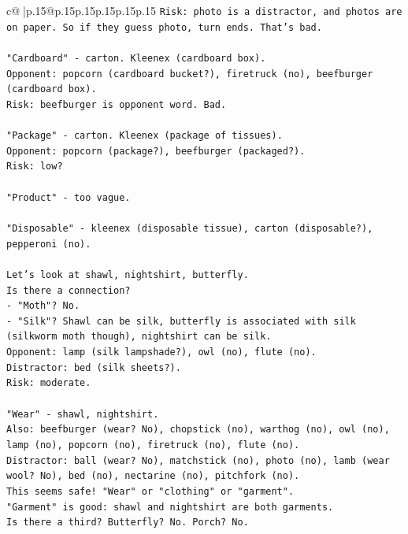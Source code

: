 \documentclass{article}
\begin{document}
{\begin{supertabular}{c@{$\;$}|p{.15\linewidth}@{}p{.15\linewidth}p{.15\linewidth}p{.15\linewidth}p{.15\linewidth}p{.15\linewidth}}
{{{\texttt{Risk: photo is a distractor, and photos are on paper. So if they guess photo, turn ends. That's bad.} \\
\\ 
\texttt{"Cardboard" {-} carton. Kleenex (cardboard box). } \\
\texttt{Opponent: popcorn (cardboard bucket?), firetruck (no), beefburger (cardboard box).} \\
\texttt{Risk: beefburger is opponent word. Bad.} \\
\\ 
\texttt{"Package" {-} carton. Kleenex (package of tissues).} \\
\texttt{Opponent: popcorn (package?), beefburger (packaged?).} \\
\texttt{Risk: low?} \\
\\ 
\texttt{"Product" {-} too vague.} \\
\\ 
\texttt{"Disposable" {-} kleenex (disposable tissue), carton (disposable?), pepperoni (no).} \\
\\ 
\texttt{Let's look at shawl, nightshirt, butterfly.} \\
\texttt{Is there a connection? } \\
\texttt{{-} "Moth"? No.} \\
\texttt{{-} "Silk"? Shawl can be silk, butterfly is associated with silk (silkworm moth though), nightshirt can be silk.} \\
\texttt{Opponent: lamp (silk lampshade?), owl (no), flute (no).} \\
\texttt{Distractor: bed (silk sheets?).} \\
\texttt{Risk: moderate.} \\
\\ 
\texttt{"Wear" {-} shawl, nightshirt.} \\
\texttt{Also: beefburger (wear? No), chopstick (no), warthog (no), owl (no), lamp (no), popcorn (no), firetruck (no), flute (no).} \\
\texttt{Distractor: ball (wear? No), matchstick (no), photo (no), lamb (wear wool? No), bed (no), nectarine (no), pitchfork (no).} \\
\texttt{This seems safe! "Wear" or "clothing" or "garment".} \\
\texttt{"Garment" is good: shawl and nightshirt are both garments.} \\
\texttt{Is there a third? Butterfly? No. Porch? No.} \\
}}}
\end{supertabular}}
\end{document}
